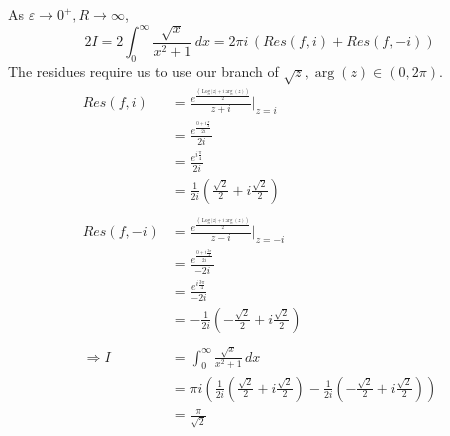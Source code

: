 \documentclass[11pt]{article}
\begin{document}
As $\varepsilon \to 0^+, R \to \infty$, 
$$ 2I = 2\int_0^{\infty}\frac{\sqrt{x}}{x^2 + 1}\,dx = 2\pi i \, (Res(f, i) + Res(f, -i)) $$
The residues require us to use our branch of $\sqrt{z}, \operatorname{arg}(z) \in (0, 2\pi)$. 
\begin{align*}
Res(f, i) &= \frac{e^{\frac{\left(\operatorname{Log}|z| + i\operatorname{arg}(z)\right)}{2}}}{z + i} \Bigg\rvert_{z = i} \\
&= \frac{e^{\frac{0 + i\frac{\pi}{2}}{2i}}}{2i} \\
&= \frac{e^{i\frac{\pi}{4}}}{2i} \\
&= \frac{1}{2i}\left(\frac{\sqrt{2}}{2} + i\frac{\sqrt{2}}{2}\right) \\
& \\
Res(f, -i) &= \frac{e^{\frac{\left(\operatorname{Log}|z| + i\operatorname{arg}(z)\right)}{2}}}{z - i} \Bigg\rvert_{z = -i} \\
&= \frac{e^{\frac{0 + i\frac{3\pi}{2}}{2i}}}{-2i} \\
&= \frac{e^{i\frac{3\pi}{4}}}{-2i} \\
&= -\frac{1}{2i}\left(-\frac{\sqrt{2}}{2} + i\frac{\sqrt{2}}{2}\right) \\
& \\
\Rightarrow I &= \int_{0}^{\infty} \frac{\sqrt{x}}{x^2 + 1} \, dx \\
&= \pi i \left(\frac{1}{2i}\left(\frac{\sqrt{2}}{2} + i\frac{\sqrt{2}}{2}\right) - \frac{1}{2i}\left(-\frac{\sqrt{2}}{2} + i\frac{\sqrt{2}}{2}\right)\right) \\ 
&= \frac{\pi}{\sqrt{2}}
\end{align*}

\newpage
\end{document}
